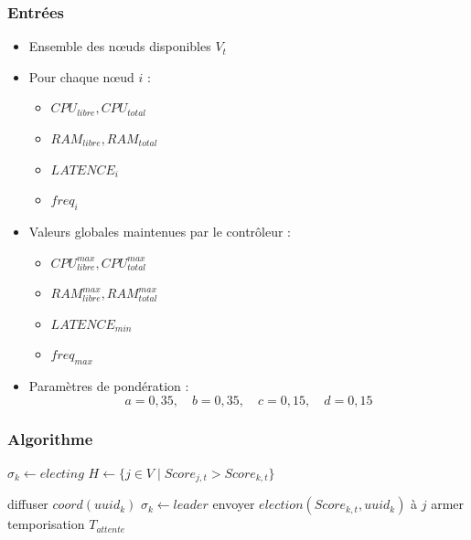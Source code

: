 \documentclass[12pt,a4paper]{report}
\theoremstyle{definition}
\begin{document}
\subsubsection{Entrées}

\begin{itemize}
    \item[$\bullet$] Ensemble des nœuds disponibles $V_t$
    \item[$\bullet$] Pour chaque nœud $i$ :
    \begin{itemize}
        \item[$-$] $CPU_{libre}, CPU_{total}$
        \item [$-$]$RAM_{libre}, RAM_{total}$
        \item[$-$] $LATENCE_i$
        \item[$-$] $freq_i$
    \end{itemize}
    \item[$\bullet$] Valeurs globales maintenues par le contrôleur :
    \begin{itemize}
        \item[$-$] $CPU_{libre}^{max}, CPU_{total}^{max}$
        \item [$-$]$RAM_{libre}^{max}, RAM_{total}^{max}$
        \item[$-$] $LATENCE_{min}$
        \item [$-$]$freq_{max}$
    \end{itemize}
    \item [$\bullet$] Paramètres de pondération :
    \[
    a = 0{,}35,\quad b = 0{,}35,\quad c = 0{,}15,\quad d = 0{,}15
    \]
\end{itemize}

\subsubsection{Algorithme}

\begin{algorithm}
\caption{Initiation d'une élection par le nœud $k$}
\begin{algorithmic}[1]
\State $\sigma_k \gets electing$
\State $H \gets \{ j \in V \mid Score_{j,t} > Score_{k,t} \}$

    \State diffuser $coord(uuid_k)$
    \State $\sigma_k \gets leader$
\Else
        \State envoyer $election(Score_{k,t}, uuid_k)$ à $j$
    \EndFor
    \State armer temporisation $T_{attente}$
\EndIf
\end{algorithmic}
\end{algorithm}
\end{document}
